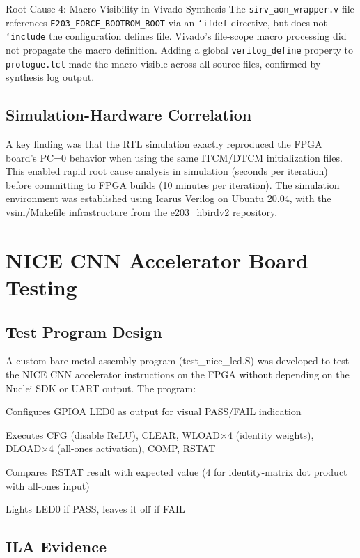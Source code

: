 Root Cause 4: Macro Visibility in Vivado Synthesis The \texttt{sirv\_aon\_wrapper.v} file references \texttt{E203\_FORCE\_\-BOOTROM\_\-BOOT} via an \texttt{`ifdef} directive, but does not \texttt{`include} the configuration defines file. Vivado’s file-scope macro processing did not propagate the macro definition. Adding a global \texttt{verilog\_define} property to \texttt{prologue.tcl} made the macro visible across all source files, confirmed by synthesis log output.


\subsection{Simulation-Hardware Correlation}

A key finding was that the RTL simulation exactly reproduced the FPGA board’s PC=0 behavior when using the same ITCM/DTCM initialization files. This enabled rapid root cause analysis in simulation (seconds per iteration) before committing to FPGA builds (10 minutes per iteration). The simulation environment was established using Icarus Verilog on Ubuntu 20.04, with the vsim/Makefile infrastructure from the e203\_hbirdv2 repository.


\section{NICE CNN Accelerator Board Testing}\label{sec:4_5}

\subsection{Test Program Design}

A custom bare-metal assembly program (test\_nice\_led.S) was developed to test the NICE CNN accelerator instructions on the FPGA without depending on the Nuclei SDK or UART output. The program:


Configures GPIOA LED0 as output for visual PASS/FAIL indication


Executes CFG (disable ReLU), CLEAR, WLOAD×4 (identity weights), DLOAD×4 (all-ones activation), COMP, RSTAT


Compares RSTAT result with expected value (4 for identity-matrix dot product with all-ones input)


Lights LED0 if PASS, leaves it off if FAIL


\subsection{ILA Evidence}

